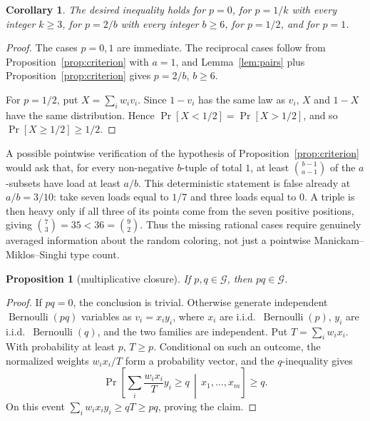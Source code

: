 \documentclass[12pt]{article}
\newtheorem{proposition}{Proposition}
\newtheorem{corollary}{Corollary}
\newcommand{\Ber}{\operatorname{Bernoulli}}
\begin{document}
\begin{corollary}\label{cor:positive}
The desired inequality holds for \(p=0\), for \(p=1/k\) with every integer
\(k\ge3\), for \(p=2/b\) with every integer \(b\ge6\), for \(p=1/2\), and for
\(p=1\).
\end{corollary}

\begin{proof}
The cases \(p=0,1\) are immediate.  The reciprocal cases follow from
Proposition~\ref{prop:criterion} with \(a=1\), and Lemma~\ref{lem:pairs} plus
Proposition~\ref{prop:criterion} gives \(p=2/b\), \(b\ge6\).

For \(p=1/2\), put \(X=\sum_i w_i v_i\).  Since \(1-v_i\) has the same law as
\(v_i\), \(X\) and \(1-X\) have the same distribution.  Hence
\(\Pr[X<1/2]=\Pr[X>1/2]\), and so \(\Pr[X\ge1/2]\ge1/2\).
\end{proof}

A possible pointwise verification of the hypothesis of
Proposition~\ref{prop:criterion} would ask that, for every non-negative
\(b\)-tuple of total \(1\), at least \(\binom{b-1}{a-1}\) of the
\(a\)-subsets have load at least \(a/b\).  This deterministic statement is
false already at \(a/b=3/10\): take seven
loads equal to \(1/7\) and three loads equal to \(0\).  A triple is then heavy
only if all three of its points come from the seven positive positions, giving
\(\binom73=35<36=\binom92\).  Thus the missing rational cases require genuinely
averaged information about the random coloring, not just a pointwise
Manickam--Miklos--Singhi type count.

\begin{proposition}[multiplicative closure]\label{prop:closure}
If \(p,q\in\mathcal G\), then \(pq\in\mathcal G\).
\end{proposition}

\begin{proof}
If \(pq=0\), the conclusion is trivial.  Otherwise generate independent
\(\Ber(pq)\) variables as \(v_i=x_i y_i\), where
\(x_i\) are i.i.d.\ \(\Ber(p)\), \(y_i\) are i.i.d.\ \(\Ber(q)\), and the two
families are independent.  Put \(T=\sum_i w_i x_i\).  With probability at least
\(p\), \(T\ge p\).  Conditional on such an outcome, the normalized weights
\(w_i x_i/T\) form a probability vector, and the \(q\)-inequality gives
\[
 \Pr\!\left[\sum_i \frac{w_i x_i}{T}y_i\ge q\,\middle|\,x_1,\ldots,x_m\right]
 \ge q .
\]
On this event \(\sum_i w_i x_i y_i\ge qT\ge pq\), proving the claim.
\end{proof}
\end{document}
